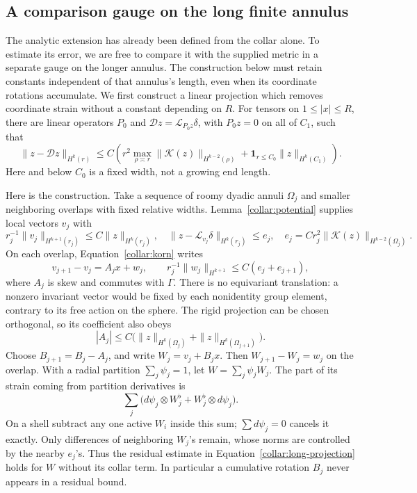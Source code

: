 \subsection{A comparison gauge on the long finite annulus}
\label{collar:comparison-gauge}

The analytic extension has already been defined from the collar alone.
To estimate its error, we are free to compare it with the supplied
metric in a separate gauge on the longer annulus. The construction
below must retain constants independent of that annulus's length,
even when its coordinate rotations accumulate.
We first construct a linear projection which removes coordinate
strain without a constant depending on \(R\).  For tensors on
\(1\le |x|\le R\), there are linear operators
\(P_0\) and \(\mathcal D z=\mathcal L_{P_0z}\delta\), with
\(P_0z=0\) on all of \(C_1\), such that
\begin{equation}
 \|z-\mathcal Dz\|_{H^k(r)}
 \le C\left(r^2\max_{\rho\asymp r}
       \|\mathcal K(z)\|_{H^{k-2}(\rho)}
       +\mathbf1_{r\le C_0}\|z\|_{H^k(C_1)}\right).
 \label{collar:long-projection}
\end{equation}
Here and below \(C_0\) is a fixed width, not a growing end length.

Here is the construction.  Take a sequence of roomy dyadic annuli
\(\Omega_j\) and smaller neighboring overlaps with fixed relative
widths.  Lemma~\ref{collar:potential} supplies local vectors \(v_j\)
with
\[
 r_j^{-1}\|v_j\|_{H^{k+1}(r_j)}\le C\|z\|_{H^k(r_j)},
 \quad
 \|z-\mathcal L_{v_j}\delta\|_{H^k(r_j)}\le e_j,
 \quad
 e_j=Cr_j^2\|\mathcal K(z)\|_{H^{k-2}(\Omega_j)}.
\]
On each overlap, Equation~\eqref{collar:korn} writes
\[
 v_{j+1}-v_j=A_jx+w_j,
 \qquad r_j^{-1}\|w_j\|_{H^{k+1}}
                  \le C(e_j+e_{j+1}),
\]
where \(A_j\) is skew and commutes with \(\Gamma\).
There is no equivariant translation: a nonzero invariant vector
would be fixed by each nonidentity group element, contrary to its
free action on the sphere.  The rigid projection can be chosen
orthogonal, so its coefficient also obeys
\[
 |A_j|\le C\bigl(\|z\|_{H^k(\Omega_j)}
                       +\|z\|_{H^k(\Omega_{j+1})}\bigr).
\]
Choose \(B_{j+1}=B_j-A_j\), and write \(W_j=v_j+B_jx\).
Then \(W_{j+1}-W_j=w_j\) on the overlap.  With a radial partition
\(\sum_j\psi_j=1\), let \(W=\sum_j\psi_jW_j\).
The part of its strain coming from partition derivatives is
\[
 \sum_j\bigl(d\psi_j\otimes W_j^\flat
                  +W_j^\flat\otimes d\psi_j\bigr).
\]
On a shell subtract any one active \(W_i\) inside this sum;
\(\sum d\psi_j=0\) cancels it exactly.  Only differences of
neighboring \(W_j\)'s remain, whose norms are controlled by the
nearby \(e_j\)'s.  Thus the residual estimate in
Equation~\eqref{collar:long-projection} holds for \(W\) without its
collar term.  In particular a cumulative rotation \(B_j\) never
appears in a residual bound.


